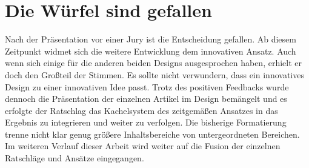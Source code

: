 \section{Die Würfel sind gefallen}
Nach der Präsentation vor einer Jury ist die Entscheidung gefallen. Ab diesem Zeitpunkt widmet sich die weitere Entwicklung dem innovativen Ansatz. Auch wenn sich einige für die anderen beiden Designs ausgesprochen haben, erhielt er doch den Großteil der Stimmen. Es sollte nicht verwundern, dass ein innovatives Design zu einer innovativen Idee passt.
Trotz des positiven Feedbacks wurde dennoch die Präsentation der einzelnen Artikel im Design bemängelt und es erfolgte der Ratschlag das Kachelsystem des zeitgemäßen Ansatzes in das Ergebnis zu integrieren und weiter zu verfolgen. Die bisherige Formatierung trenne nicht klar genug größere Inhaltsbereiche von untergeordneten Bereichen.
Im weiteren Verlauf dieser Arbeit wird weiter auf die Fusion der einzelnen Ratschläge und Ansätze eingegangen.
